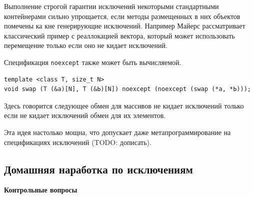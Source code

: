 \documentclass[a4paper,12pt,oneside]{article}
\begin{document}
Выполнение строгой гарантии исключений некоторыми стандартными контейнерами сильно упрощается, если методы размещенных в них объектов помечены ка кне генерирующие исключений. Например Майерс рассматривает классический пример с реаллокацией вектора, который может использовать перемещение только если оно не кидает исключений.

Спецификация \lstinline!noexcept! также может быть вычисляемой.

\begin{lstlisting}
template <class Т, size_t N>
void swap (T (&а)[N], Т (&Ь)[N]) noexcept (noexсept (swap (*a, *Ь)));
\end{lstlisting}

Здесь говорится следующее обмен для массивов не кидает исключений только если не кидает исключений обмен для их элементов.

Эта идея настолько мощна, что допускает даже метапрограммирование на спецификациях исключений (TODO: дописать).

\pagebreak
\subsection{Домашняя наработка по исключениям}

\textbf{Контрольные вопросы}
\end{document}
